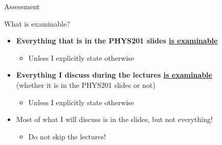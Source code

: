 \begin{frame}{Assessment}
\end{frame}

%
%
%

\begin{frame}{What is examinable?}

\begin{itemize}
  \item {\bf Everything that is in the PHYS201 slides \underline{is examinable}}
  \begin{itemize}
      \item Unless I explicitly state otherwise
  \end{itemize}

  \vspace{0.3cm}

  \item {\bf Everything I discuss during the lectures \underline{is examinable}}\\
        (whether it is in the PHYS201 slides or not)
  \begin{itemize}
      \item Unless I explicitly state otherwise
  \end{itemize}

  \vspace{0.3cm}

  \item Most of what I will discuss is in the slides, but not everything!
  \begin{itemize}
      \item Do not skip the lectures!
  \end{itemize}

\end{itemize}


\end{frame}

